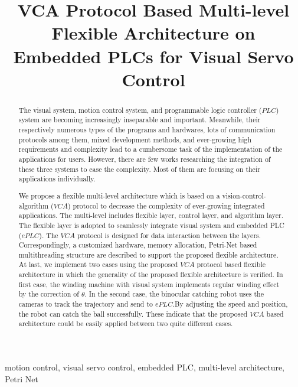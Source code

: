 \documentclass[journal,UTF8]{IEEEtran}
\begin{document}
%
\title{VCA Protocol Based Multi-level Flexible Architecture on Embedded PLCs for Visual Servo Control }

\maketitle

\begin{abstract}
The visual system, motion control system, and programmable logic controller ($PLC$) system are becoming increasingly inseparable and important. Meanwhile, their respectively numerous types of the programs and hardwares, lots of communication protocols among them, mixed development methods, and ever-growing high requirements and complexity lead to a cumbersome task of the implementation of the applications for users. However, there are few works researching the integration of these three systems to ease the complexity. Most of them are focusing on their applications individually. 

We propose a flexible multi-level architecture which is based on a vision-control-algorithm ($VCA$) protocol to decrease the complexity of ever-growing integrated applications. The multi-level includes flexible layer, control layer, and algorithm layer. The flexible layer is adopted to seamlessly integrate visual system and embedded PLC ($ePLC$). The $VCA$ protocol is designed for data interaction between the layers. Correspondingly, a customized hardware, memory allocation, Petri-Net based multithreading structure are described to support the proposed flexible architecture. At last, we implement two cases using the proposed $VCA$ protocol based flexible architecture in which the generality of the proposed flexible architecture is verified. In first case, the winding machine with visual system implements regular winding effect by the correction of $\theta$. In the second case, the binocular catching robot uses the cameras to track the trajectory and send to $ePLC$.By adjusting the speed and position, the robot can catch the ball successfully. These indicate that the proposed $VCA$ based architecture could be easily applied between two quite different cases.
\end{abstract}

\begin{IEEEkeywords}
motion control, visual servo control, embedded PLC, multi-level architecture, Petri Net
\end{IEEEkeywords}
\end{document}
